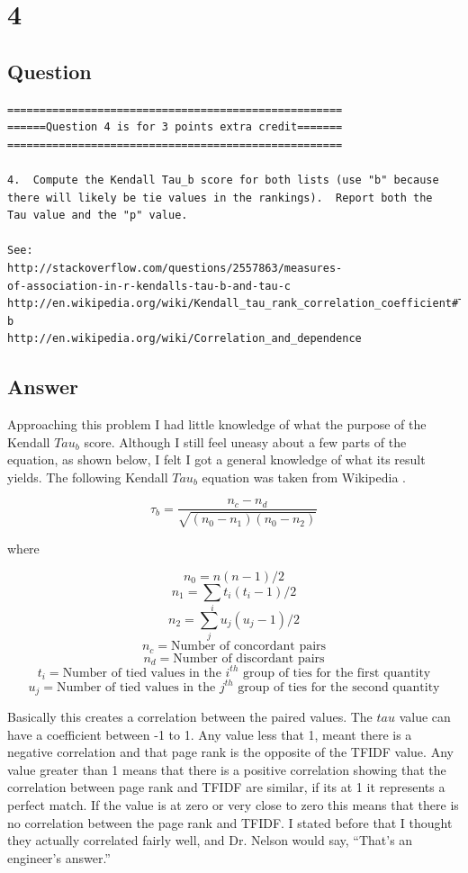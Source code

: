 \documentclass[letterpaper,11pt]{article}
\begin{document}
\clearpage


\section*{4}

\subsection*{Question}

\begin{verbatim}
====================================================
======Question 4 is for 3 points extra credit=======
====================================================

4.  Compute the Kendall Tau_b score for both lists (use "b" because
there will likely be tie values in the rankings).  Report both the
Tau value and the "p" value.

See: 
http://stackoverflow.com/questions/2557863/measures-
of-association-in-r-kendalls-tau-b-and-tau-c
http://en.wikipedia.org/wiki/Kendall_tau_rank_correlation_coefficient#Tau-b
http://en.wikipedia.org/wiki/Correlation_and_dependence
\end{verbatim}

\clearpage
\subsection*{Answer}

Approaching this problem I had little knowledge of what the purpose of the Kendall $Tau_b$ score. Although I still feel uneasy about a few parts of the equation, as shown below, I felt I got a general knowledge of what its result yields. The following Kendall $Tau_b$ equation was taken from Wikipedia \cite{wikipediaref}.

\[ \tau_b = \frac{n_c - n_d}{\sqrt{(n_0 - n_1)(n_0 - n_2)}} \]

where

\[ n_0 = n(n-1)/2 \]
\[ n_1 = \sum_i t_i (t_i - 1)/2 \]
\[ n_2 = \sum_j u_j (u_j - 1)/2 \]
\[ n_c = \textrm{Number of concordant pairs} \]
\[ n_d = \textrm{Number of discordant pairs} \]
\[ t_i = \textrm{Number of tied values in the $i^{th}$ group of ties for the first quantity} \]
\[ u_j = \textrm{Number of tied values in the $j^{th}$ group of ties for the second quantity} \]

Basically this creates a correlation between the paired values. The $tau$ value can have a coefficient between -1 to 1. Any value less that 1, meant there is a negative correlation and that page rank is the opposite of the TFIDF value. Any value greater than 1 means that there is a positive correlation showing that the correlation between page rank and TFIDF are similar, if its at 1 it represents a perfect match. If the value is at zero or very close to zero this means that there is no correlation between the page rank and TFIDF. I stated before that I thought they actually correlated fairly well, and Dr. Nelson would say, ``That's an engineer's answer.''
\end{document}
